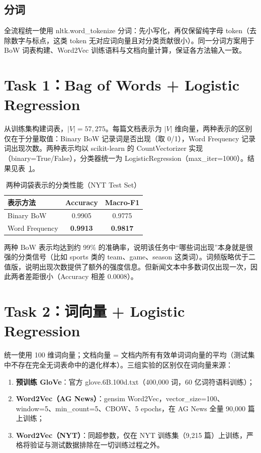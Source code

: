 \documentclass[UTF8,a4paper,10pt]{ctexart}
\begin{document}
\subsection{分词}
全流程统一使用 nltk.word\_tokenize 分词：先小写化，再仅保留纯字母 token（去除数字与标点，这类 token 无对应词向量且对分类贡献很小）。同一分词方案用于 BoW 词表构建、Word2Vec 训练语料与文档向量计算，保证各方法输入一致。

\section{Task 1：Bag of Words + Logistic Regression}

从训练集构建词表，$|V| = 57{,}275$。每篇文档表示为 $|V|$ 维向量，两种表示的区别仅在于分量取值：Binary BoW 记录词是否出现（取 0/1），Word Frequency 记录词出现次数。两种表示均以 scikit-learn 的 CountVectorizer 实现（binary=True/False），分类器统一为 LogisticRegression（max\_iter=1000）。结果见表~\ref{tab:task1}。

\begin{table}[!htbp]
  \centering
  \begin{tabular}{lcc}
  \toprule
  表示方法 & Accuracy & Macro-F1 \\
  \midrule
  Binary BoW     & 0.9905 & 0.9775 \\
  Word Frequency & \textbf{0.9913} & \textbf{0.9817} \\
  \bottomrule
  \end{tabular}
  \caption{两种词袋表示的分类性能（NYT Test Set）}
  \label{tab:task1}
\end{table}

两种 BoW 表示均达到约 99\% 的准确率，说明该任务中“哪些词出现”本身就是很强的分类信号（比如 sports 类的 team、game、season 这类词）。词频版略优于二值版，说明出现次数提供了额外的强度信息。但新闻文本中多数词仅出现一次，因此两者差距很小（Accuracy 相差 0.0008）。

\section{Task 2：词向量 + Logistic Regression}

统一使用 100 维词向量；文档向量 = 文档内所有有效单词词向量的平均（测试集中不存在完全无词表命中的退化样本）。三组实验的区别仅在词向量来源：

\begin{enumerate}
  \item \textbf{预训练 GloVe}：官方 glove.6B.100d.txt（400,000 词，60 亿词符语料训练）；
  \item \textbf{Word2Vec（AG News）}：gensim Word2Vec，vector\_size=100、window=5、min\_count=5、CBOW、5 epochs，在 AG News 全量 90,000 篇上训练；
  \item \textbf{Word2Vec（NYT）}：同超参数，仅在 NYT 训练集（9,215 篇）上训练，严格将验证与测试数据排除在一切训练过程之外。
\end{enumerate}
\end{document}
